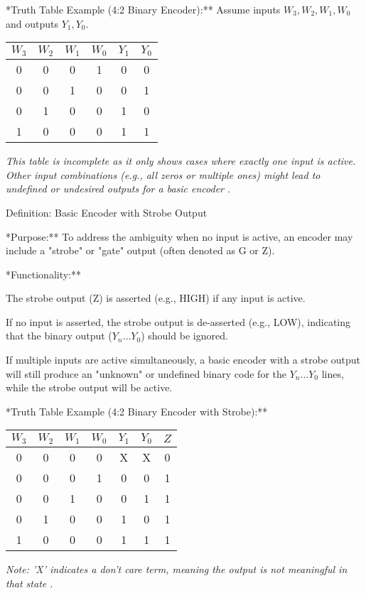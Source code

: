 \documentclass{article}
\begin{document}
\item **Truth Table Example (4:2 Binary Encoder):** Assume inputs $W_3, W_2, W_1, W_0$ and outputs $Y_1, Y_0$. \begin{tabular}{|cccc|cc|} \\ \hline $W_3$ & $W_2$ & $W_1$ & $W_0$ & $Y_1$ & $Y_0$ \\ \hline
 0 & 0 & 0 & 1 & 0 & 0 \\ 0 & 0 & 1 & 0 & 0 & 1 \\ 0 & 1 & 0 & 0 & 1 & 0 \\ 1 & 0 & 0 & 0 & 1 & 1 \\ \hline

\end{tabular}
 \textit{This table is incomplete as it only shows cases where exactly one input is active. Other input combinations (e.g., all zeros or multiple ones) might lead to undefined or undesired outputs for a basic encoder} \textit{.}

Definition: Basic Encoder with Strobe Output

\item **Purpose:** To address the ambiguity when no input is active, an encoder may include a "strobe" or "gate" output (often denoted as G or Z).

\item **Functionality:**

    \item The strobe output (Z) is asserted (e.g., HIGH) if any input is active.

    \item If no input is asserted, the strobe output is de-asserted (e.g., LOW), indicating that the binary output ($Y_n \dots Y_0$) should be ignored.

    \item If multiple inputs are active simultaneously, a basic encoder with a strobe output will still produce an "unknown" or undefined binary code for the $Y_n \dots Y_0$ lines, while the strobe output will be active.

\item **Truth Table Example (4:2 Binary Encoder with Strobe):** \begin{tabular}{|cccc|ccc|} \\ \hline $W_3$ & $W_2$ & $W_1$ & $W_0$ & $Y_1$ & $Y_0$ & $Z$ \\ \hline
 0 & 0 & 0 & 0 & X & X & 0 \\ 0 & 0 & 0 & 1 & 0 & 0 & 1 \\ 0 & 0 & 1 & 0 & 0 & 1 & 1 \\ 0 & 1 & 0 & 0 & 1 & 0 & 1 \\ 1 & 0 & 0 & 0 & 1 & 1 & 1 \\ \hline

\end{tabular}
 \textit{Note: 'X' indicates a don't care term, meaning the output is not meaningful in that state} \textit{.}
\end{document}
